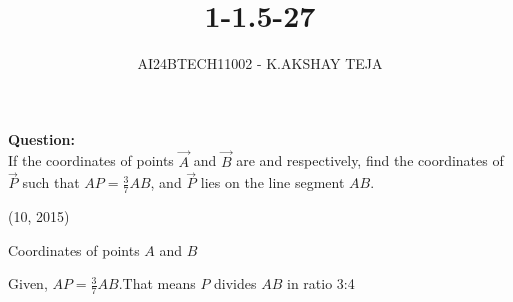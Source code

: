\documentclass[journal]{IEEEtran}
\begin{document}

\vspace{3cm}

\title{1-1.5-27}
\author{AI24BTECH11002 - K.AKSHAY TEJA}
{\let\newpage\relax\maketitle}

\renewcommand{\thefigure}{\theenumi}
\renewcommand{\thetable}{\theenumi}
\setlength{\intextsep}{10pt} %


\renewcommand{\thetable}{\theenumi}

\textbf{Question:}\\
 If the coordinates of points $\vec{A}$ and $\vec{B}$ are  and  respectively, find the coordinates of $\vec{P}$ such that $AP = \frac{3}{7} AB$, and $\vec{P}$ lies on the line segment $AB$. 
 
    \hfill {(10, 2015)}

 \solution
 \begin{table}[h!]
	 \centering
	  
	\caption{Coordinates of points $A$ and $B$}
	 \label{tab:Coordinates}
\end{table}

Given, $AP = \frac{3}{7} AB$.That means $P$ divides $AB$ in ratio 3:4\\
\end{document}
